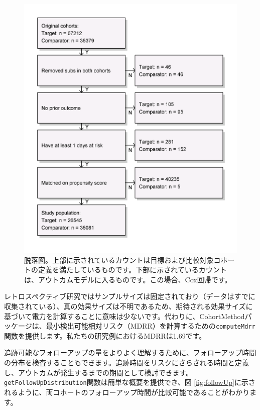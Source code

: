 \documentclass[
  11pt]{book}
\theoremstyle{definition}
\theoremstyle{definition}
\theoremstyle{definition}
\theoremstyle{definition}
\theoremstyle{remark}
\begin{document}
\begin{figure}

{\centering \includegraphics[width=0.7\linewidth]{images/PopulationLevelEstimation/attrition} 

}

\caption{脱落図。上部に示されているカウントは目標および比較対象コホートの定義を満たしているものです。下部に示されているカウントは、アウトカムモデルに入るものです。この場合、Cox回帰です。}\label{fig:attrition}
\end{figure}

レトロスペクティブ研究ではサンプルサイズは固定されており（データはすでに収集されている）、真の効果サイズは不明であるため、期待される効果サイズに基づいて電力を計算することに意味は少ないです。代わりに、CohortMethodパッケージは、最小検出可能相対リスク（MDRR）を計算するための\texttt{computeMdrr}関数を提供します。私たちの研究例におけるMDRRは1.69です。  

追跡可能なフォローアップの量をよりよく理解するために、フォローアップ時間の分布を検査することもできます。追跡時間をリスクにさらされる時間と定義し、アウトカムが発生するまでの期間として検討できます。\texttt{getFollowUpDistribution}関数は簡単な概要を提供でき、図 \ref{fig:followUp}に示されるように、両コホートのフォローアップ時間が比較可能であることがわかります。
\end{document}
